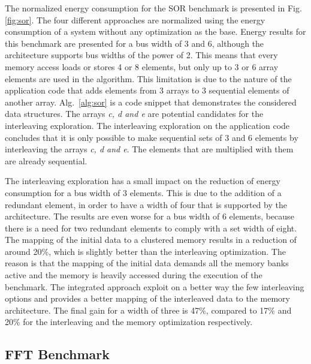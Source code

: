 The normalized energy consumption for the SOR benchmark is presented in Fig.\ref{fig:sor}.
The four different approaches are normalized using the energy consumption of a system without any optimization as the base.
Energy results for this benchmark are presented for a bus width of 3 and 6, although the architecture supports bus widths of the power of 2.
This means that every memory access loads or stores 4 or 8 elements, but only up to 3 or 6 array elements are used in the algorithm.
This limitation is due to the nature of the application code that adds elements from 3 arrays to 3 sequential elements of another array. 
Alg.~\ref{alg:sor} is a code snippet that demonstrates the considered data structures.
The arrays \textit{c, d and e} are potential candidates for the interleaving exploration.
The interleaving exploration on the application code concludes that it is only possible to make sequential sets of 3 and 6 elements by interleaving the arrays \textit{c, d and e}.
The elements that are multiplied with them are already sequential.

 The interleaving exploration has a small impact on the reduction of energy consumption for a bus width of 3 elements.
 This is due to the addition of a redundant element, in order to have a width of four that is supported by the architecture.
The results are even worse for a bus width of 6 elements, because there is a need for two redundant elements to comply with a set width of eight.
The mapping of the initial data to a clustered memory results in a reduction of around 20\%, which is slightly better than the interleaving optimization.
The reason is that the mapping of the initial data demands all the memory banks active and the memory is heavily accessed during the execution of the benchmark.
The integrated approach exploit on a better way the few interleaving options and provides a better mapping of the interleaved data to the memory architecture.
The final gain for a width of three is 47\%, compared to 17\% and 20\% for the interleaving and the memory optimization respectively.

\subsection{FFT Benchmark}

